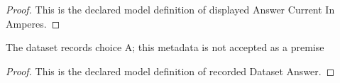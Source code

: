 \begin{proof}
  This is the declared model definition of displayed Answer Current In Amperes.
\end{proof}
\begin{definition}
  \label{def:physics:phyx-mini-0614:phyxminiproblems-problemphyxmini0614-recordeddatasetanswer}
  The dataset records choice A; this metadata is not accepted as a premise
\end{definition}
\begin{proof}
  This is the declared model definition of recorded Dataset Answer.
\end{proof}
